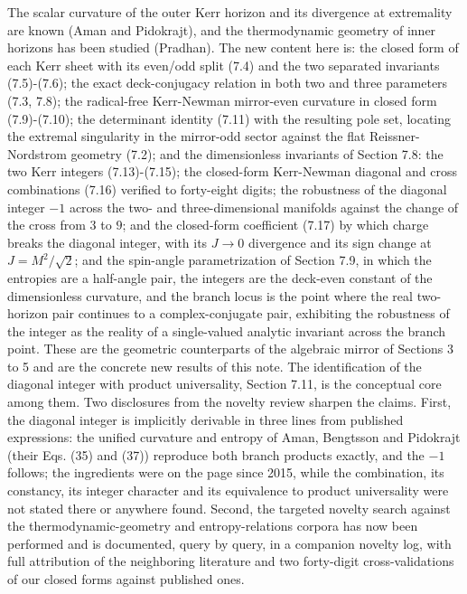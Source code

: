 \documentclass[11pt]{article}
\begin{document}
The scalar curvature of the outer Kerr horizon and its divergence at extremality are known (Aman and Pidokrajt), and the thermodynamic geometry of inner horizons has been studied (Pradhan). The new content here is: the closed form of each Kerr sheet with its even/odd split (7.4) and the two separated invariants (7.5)-(7.6); the exact deck-conjugacy relation in both two and three parameters (7.3, 7.8); the radical-free Kerr-Newman mirror-even curvature in closed form (7.9)-(7.10); the determinant identity (7.11) with the resulting pole set, locating the extremal singularity in the mirror-odd sector against the flat Reissner-Nordstrom geometry (7.2); and the dimensionless invariants of Section 7.8: the two Kerr integers (7.13)-(7.15); the closed-form Kerr-Newman diagonal and cross combinations (7.16) verified to forty-eight digits; the robustness of the diagonal integer $-1$ across the two- and three-dimensional manifolds against the change of the cross from $3$ to $9$; and the closed-form coefficient (7.17) by which charge breaks the diagonal integer, with its $J \to 0$ divergence and its sign change at $J = M^2/\sqrt{2}$; and the spin-angle parametrization of Section 7.9, in which the entropies are a half-angle pair, the integers are the deck-even constant of the dimensionless curvature, and the branch locus is the point where the real two-horizon pair continues to a complex-conjugate pair, exhibiting the robustness of the integer as the reality of a single-valued analytic invariant across the branch point. These are the geometric counterparts of the algebraic mirror of Sections 3 to 5 and are the concrete new results of this note. The identification of the diagonal integer with product universality, Section 7.11, is the conceptual core among them. Two disclosures from the novelty review sharpen the claims. First, the diagonal integer is implicitly derivable in three lines from published expressions: the unified curvature and entropy of Aman, Bengtsson and Pidokrajt (their Eqs. (35) and (37)) reproduce both branch products exactly, and the $-1$ follows; the ingredients were on the page since 2015, while the combination, its constancy, its integer character and its equivalence to product universality were not stated there or anywhere found. Second, the targeted novelty search against the thermodynamic-geometry and entropy-relations corpora has now been performed and is documented, query by query, in a companion novelty log, with full attribution of the neighboring literature and two forty-digit cross-validations of our closed forms against published ones.
\end{document}
